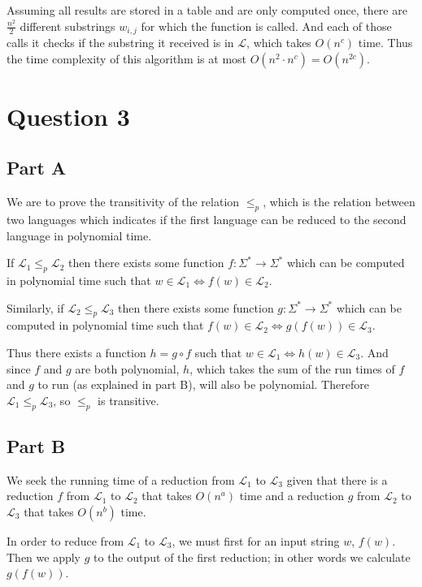 \documentclass{article}
\newcommand{\lang}{\mathcal{L}}
\begin{document}
Assuming all results are stored in a table and are only computed once, there are \(\frac{n^2}{2}\) different substrings \(w_{i,j}\) for which the function is called. And each of those calls it checks if the substring it received is in \(\lang\), which takes \(O(n^c)\) time. Thus the time complexity of this algorithm is at most \(O(n^2 \cdot n^c) = O(n^{2c})\).

\section*{Question 3}

\subsection*{Part A}

We are to prove the transitivity of the relation \(\leq_p\), which is the relation between two languages which indicates if the first language can be reduced to the second language in polynomial time.

If \(\lang_1 \leq_p \lang_2\) then there exists some function \(f: \Sigma^* \to \Sigma^*\) which can be computed in polynomial time such that \(w \in \lang_1 \Leftrightarrow f(w) \in \lang_2\).

Similarly, if \(\lang_2 \leq_p \lang_3\) then there exists some function \(g: \Sigma^* \to \Sigma^*\) which can be computed in polynomial time such that \(f(w) \in \lang_2 \Leftrightarrow g(f(w)) \in \lang_3\).

Thus there exists a function \(h = g \circ f\) such that \(w \in \lang_1 \Leftrightarrow h(w) \in \lang_3\). And since \(f\) and \(g\) are both polynomial, \(h\), which takes the sum of the run times of \(f\) and \(g\) to run (as explained in part B), will also be polynomial. Therefore \(\lang_1 \leq_p \lang_3\), so \(\le_p\) is transitive.

\subsection*{Part B}

We seek the running time of a reduction from \(\lang_1\) to \(\lang_3\) given that there is a reduction \(f\) from \(\lang_1\) to \(\lang_2\) that takes \(O(n^{a})\) time and a reduction \(g\) from \(\lang_2\) to \(\lang_3\) that takes \(O(n^b)\) time.

In order to reduce from \(\lang_1\) to \(\lang_3\), we must first for an input string \(w\), \(f(w)\). Then we apply \(g\) to the output of the first reduction; in other words we calculate \(g(f(w))\).
\end{document}
